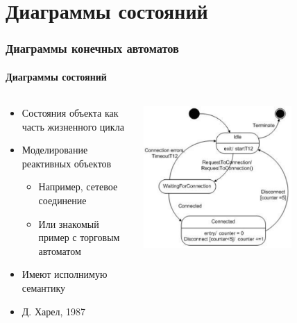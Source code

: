 \documentclass{../../slides-style}
\begin{document}
    \begin{frame}[plain]
        \titlepage
    \end{frame}

    \section{Диаграммы состояний}

    \begin{frame}
        \frametitle{Диаграммы конечных автоматов}
        \framesubtitle{Диаграммы состояний}
        \begin{columns}
            \begin{column}{0.5\textwidth}
                \begin{itemize}
                    \item Состояния объекта как часть жизненного цикла
                    \item Моделирование реактивных объектов
                    \begin{itemize}
                        \item Например, сетевое соединение
                        \item Или знакомый пример с торговым автоматом
                    \end{itemize}
                    \item Имеют исполнимую семантику
                    \item Д. Харел, 1987
                \end{itemize}
            \end{column}
            \begin{column}{0.5\textwidth}
                \begin{center}
                    \includegraphics[width=0.7\textwidth]{stateTransitionExample.png}
                \end{center}
            \end{column}
        \end{columns}
    \end{frame}
\end{document}
